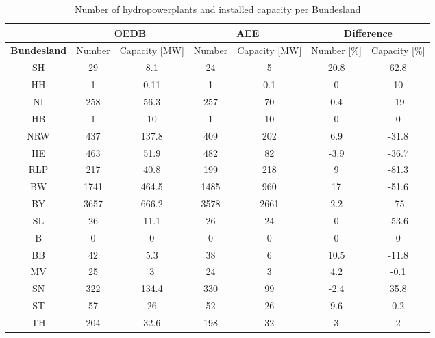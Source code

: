 \begin{table}
\footnotesize 
 \caption[Number of hydropowerplants and installed capacity per Bundesland]{Number of hydropowerplants and installed capacity per Bundesland \cite{oedb}\cite{aee}}
 \centering
 \label{oedb_aee_diff}
 \begin{tabular}{|c|cc|cc| cc|}
  \cline{2-7}
  \multicolumn{0}{c|}{} &\multicolumn{2}{|c}{\textbf{OEDB}}&\multicolumn{2}{|c|}{\textbf{AEE}}&\multicolumn{2}{c|}{\textbf{Difference}} \\
  \hline
  \textbf{Bundesland} & Number 	& 	Capacity [MW] 	&	Number 	& 	Capacity [MW] 	&	Number [\%] 	&	Capacity [\%] \\
  \hline
  SH	&	29	&	8.1		&	24	&	5		&	20.8		&	62.8	\\
  HH	&	1	&	0.11		&	1	&	0.1		&	0		&	10	\\
  NI	&	258	&	56.3		&	257	&	70		&	0.4		&	-19	\\
  HB	&	1	&	10		&	1	&	10		&	0		&	0	\\
  NRW	&	437	&	137.8		&	409	&	202		&	6.9		&	-31.8	\\
  HE	&	463	&	51.9		&	482	&	82		&	-3.9		&	-36.7	\\
  RLP	&	217	&	40.8		&	199	&	218		&	9		&	-81.3	\\
  BW	&	1741	&	464.5		&	1485	&	960		&	17		&	-51.6	\\	
  BY	&	3657	&	666.2		&	3578	&	2661		&	2.2		&	-75	\\
  SL	&	26	&	11.1		&	26	&	24		&	0		&	-53.6	\\
  B	&	0	&	0		&	0	&	0		&	0		&	0	\\
  BB	&	42	&	5.3		&	38	&	6		&	10.5		&	-11.8	\\
  MV	&	25	&	3		&	24	&	3		&	4.2		&	-0.1	\\
  SN	&	322	&	134.4		&	330	&	99		&	-2.4		&	35.8	\\
  ST	&	57	&	26		&	52	&	26		&	9.6		&	0.2	\\
  TH	&	204	&	32.6		&	198	&	32		&	3		&	2	\\
  \hline
 \end{tabular} 
\end{table}

